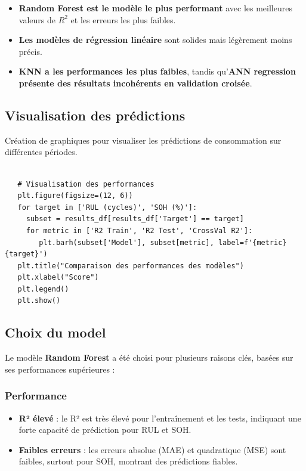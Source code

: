\begin{itemize}
	\item \textbf{Random Forest est le modèle le plus performant} avec les meilleures valeurs de $R^2$ et les erreurs les plus faibles.
	\item \textbf{Les modèles de régression linéaire} sont solides mais légèrement moins précis.
	\item \textbf{KNN a les performances les plus faibles}, tandis qu'\textbf{ANN regression présente des résultats incohérents en validation croisée}.
\end{itemize}




\subsection{Visualisation des prédictions}
Création de graphiques pour visualiser les prédictions de consommation sur différentes périodes.
\begin{verbatim}

   # Visualisation des performances
   plt.figure(figsize=(12, 6))
   for target in ['RUL (cycles)', 'SOH (%)']:
     subset = results_df[results_df['Target'] == target]
     for metric in ['R2 Train', 'R2 Test', 'CrossVal R2']:
        plt.barh(subset['Model'], subset[metric], label=f'{metric} {target}')
   plt.title("Comparaison des performances des modèles")
   plt.xlabel("Score")
   plt.legend()
   plt.show()
\end{verbatim}

\subsection{Choix du model}
Le modèle \textbf{Random Forest} a été choisi pour plusieurs raisons clés, basées sur ses performances supérieures :

\subsubsection*{Performance}
\begin{itemize}
	\item \textbf{R² élevé} : le R² est très élevé pour l'entraînement et les tests, indiquant une forte capacité de prédiction pour RUL et SOH.
	\item \textbf{Faibles erreurs} : les erreurs absolue (MAE) et quadratique (MSE) sont faibles, surtout pour SOH, montrant des prédictions fiables.
\end{itemize}

